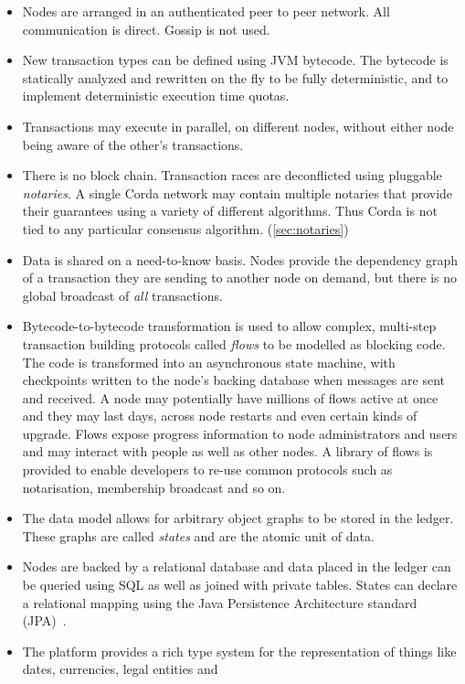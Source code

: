 \documentclass{article}
\begin{document}
\begin{itemize}
\item Nodes are arranged in an authenticated peer to peer network. All communication is direct. Gossip is not used.
\item New transaction types can be defined using JVM\cite{JVM} bytecode. The bytecode is statically analyzed and rewritten
on the fly to be fully deterministic, and to implement deterministic execution time quotas.
\item Transactions may execute in parallel, on different nodes, without either node being aware of the other's transactions.
\item There is no block chain\cite{Bitcoin}. Transaction races are deconflicted using pluggable \emph{notaries}. A single
Corda network may contain multiple notaries that provide their guarantees using a variety of different algorithms. Thus
Corda is not tied to any particular consensus algorithm. (\cref{sec:notaries})
\item Data is shared on a need-to-know basis. Nodes provide the dependency graph of a transaction they are sending to
another node on demand, but there is no global broadcast of \emph{all} transactions.
\item Bytecode-to-bytecode transformation is used to allow complex, multi-step transaction building protocols called
\emph{flows} to be modelled as blocking code. The code is transformed into an asynchronous state machine, with
checkpoints written to the node's backing database when messages are sent and received. A node may potentially have
millions of flows active at once and they may last days, across node restarts and even certain kinds of upgrade. Flows expose progress
information to node administrators and users and may interact with people as well as other nodes. A library of flows is provided
to enable developers to re-use common protocols such as notarisation, membership broadcast and so on.
\item The data model allows for arbitrary object graphs to be stored in the ledger. These graphs are called \emph{states} and are the atomic unit of data.
\item Nodes are backed by a relational database and data placed in the ledger can be queried using SQL as well as joined
with private tables. States can declare a relational mapping using the Java Persistence Architecture standard (JPA)~\cite{JPA}.
\item The platform provides a rich type system for the representation of things like dates, currencies, legal entities and

\end{itemize}
\end{document}
